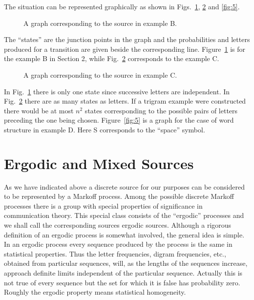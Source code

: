 The situation can be represented graphically as shown in
Figs.~\ref{fig:3}, \ref{fig:4} and \ref{fig:5}.
\begin{figure}[ht]
\centerline{}
\caption{A graph corresponding to the source in example B.}
\label{fig:3}
\end{figure}
The ``states'' are the junction points in the graph and the probabilities
and letters produced for a transition are given beside the corresponding
line.  Figure~\ref{fig:3} is for the example B in Section 2, while
Fig.~\ref{fig:4} corresponds to the example C\@.
\begin{figure}[ht]
\centerline{}
\caption{A graph corresponding to the source in example C.}
\label{fig:4}
\end{figure}
In Fig.~\ref{fig:3} there is only one state since successive letters are
independent.  In Fig.~\ref{fig:4} there are as many states as letters.
If a trigram example were constructed there would be at most $n^2$
states corresponding to the possible pairs of letters preceding the
one being chosen.  Figure~\ref{fig:5} is a graph for the case of word
structure in example D\@.  Here S corresponds to the ``space'' symbol.

\section{Ergodic and Mixed Sources}
As we have indicated above a discrete source for our purposes can be
considered to be represented by a Markoff process.  Among the possible
discrete Markoff processes there is a group with special properties of
significance in communication theory.  This special class consists of the
``ergodic'' processes and we shall call the corresponding sources ergodic
sources.  Although a rigorous definition of an ergodic process is somewhat
involved, the general idea is simple.  In an ergodic process every
sequence produced by the process is the same in statistical properties.
Thus the letter frequencies, digram frequencies, etc., obtained from
particular sequences, will, as the lengths of the sequences increase,
approach definite limits independent of the particular sequence.
Actually this is not true of every sequence but the set for which it
is false has probability zero.  Roughly the ergodic property means
statistical homogeneity.

